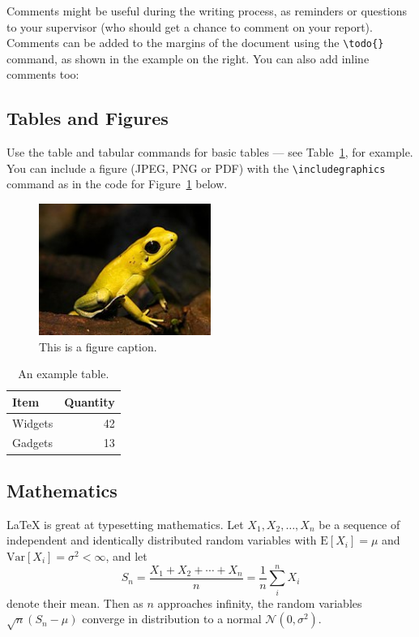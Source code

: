 \documentclass[12pt]{article}
\begin{document}
Comments might be useful during the writing process, as reminders or questions to your supervisor (who should get a chance to comment on your report).  Comments can be added to the margins of the document using the  \verb$\todo{}$ command, as shown in the example on the right. You can also add inline comments too:


\subsection{Tables and Figures}

Use the table and tabular commands for basic tables --- see Table~\ref{tab:widgets}, for example. You can include a figure (JPEG, PNG or PDF) with the \verb$\includegraphics$ command as in the code for Figure~\ref{fig:frog} below.

\begin{figure}
	\centering
	\includegraphics[width=0.5\textwidth]{figures/frog.jpg}
	\caption{\label{fig:frog}This is a figure caption.}
\end{figure}

\begin{table}
	\centering
	\begin{tabular}{l|r}
		Item    & Quantity \\\hline
		Widgets & 42       \\
		Gadgets & 13
	\end{tabular}
	\caption{\label{tab:widgets}An example table.}
\end{table}

\subsection{Mathematics}

\LaTeX{} is great at typesetting mathematics. Let $X_1, X_2, \ldots, X_n$ be a sequence of independent and identically distributed random variables with $\text{E}[X_i] = \mu$ and $\text{Var}[X_i] = \sigma^2 < \infty$, and let
$$S_n = \frac{X_1 + X_2 + \cdots + X_n}{n}
	= \frac{1}{n}\sum_{i}^{n} X_i$$
denote their mean. Then as $n$ approaches infinity, the random variables $\sqrt{n}(S_n - \mu)$ converge in distribution to a normal $\mathcal{N}(0, \sigma^2)$.
\end{document}
